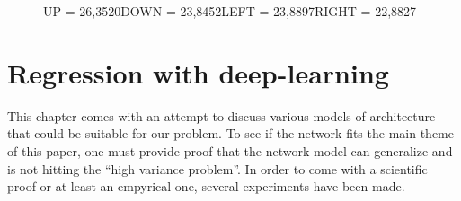 \begin{figure}[hp]
  \caption{\newline UP = 97,6530\newline DOWN = 100,0000\newline LEFT = 93,8538\newline RIGHT = 92,5261}\label{fig:fb}
\endminipage\hfill
{}%
   \caption{\newline UP = 26,3520\newline DOWN = 23,8452\newline LEFT = 23,8897\newline RIGHT = 22,8827}\label{fig:fc}
 
\endminipage
\end{figure}

\newpage
\section{Regression with deep-learning}
This chapter comes with an attempt to discuss various models of architecture that could be suitable for our problem. To see if the network fits the main theme of this paper, one must provide proof that the network model can generalize and is not hitting the ``high variance problem''. In order to come with a scientific proof or at least an empyrical one, several experiments have been made.

